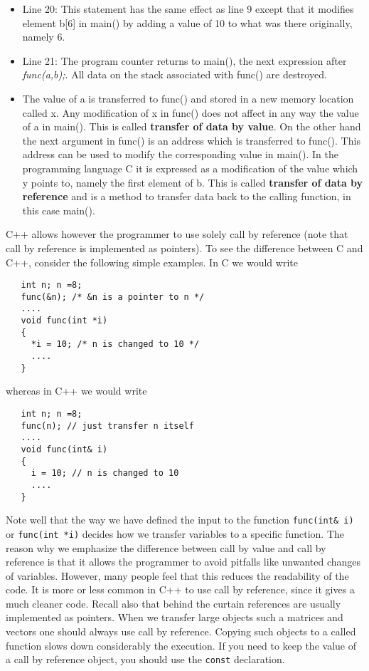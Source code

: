 \begin{itemize}
%
\item Line 20: This statement has the same effect as line 9 except
that it modifies element b[6] in main() by adding a value of 10 to
what was there originally, namely 6.
% 
\item Line 21: The program counter returns to main(), the next
expression after {\sl func(a,b);}. All data on the stack associated
with func() are destroyed.
%
\item The value of a is transferred to func() and stored
in a new memory location called x. Any modification of x in func()
does not affect in any way the value of a in main(). This is called {\bf
transfer of data by value}. On the other hand the next argument in
func() is an address which is transferred to func(). This address can
be used to modify the corresponding value in main(). In the programming  language C
it is expressed as a modification of the value 
which y points to, namely the first element of b.
This is called {\bf transfer of data by reference} and is a method to
transfer data back to the calling function, in this case  main().
% 
\end{itemize}
C++ allows however the programmer to use solely call by reference
(note that call by reference is implemented as pointers).
To see the difference between C and C++, consider the following simple
examples. In C we would write
\lstset{language=c++}
\begin{lstlisting}
   int n; n =8;
   func(&n); /* &n is a pointer to n */
   ....
   void func(int *i)
   {
     *i = 10; /* n is changed to 10 */
     ....
   }
\end{lstlisting}
whereas in C++ we would write

\begin{lstlisting}
   int n; n =8;
   func(n); // just transfer n itself
   ....
   void func(int& i)
   {
     i = 10; // n is changed to 10
     ....
   }
\end{lstlisting}
Note well that the way we have defined the input to the function 
\verb?func(int& i)? or \verb?func(int *i)? decides how we transfer
variables to a specific function.
The reason why we emphasize the difference between call by value and call 
by reference is that it allows the programmer to avoid pitfalls
like unwanted changes of variables. However, many people feel that this
reduces the readability of the code.
It is more or less common in C++ to use call by reference, since it gives a 
much cleaner code. Recall also that behind the curtain references are usually implemented as pointers. 
When we transfer large objects such a matrices and vectors
one should always use call by reference. Copying such objects
to a called function slows down considerably the execution.  If you 
need to keep the value of a call by reference object, you should use the
\verb?const? declaration.
 
